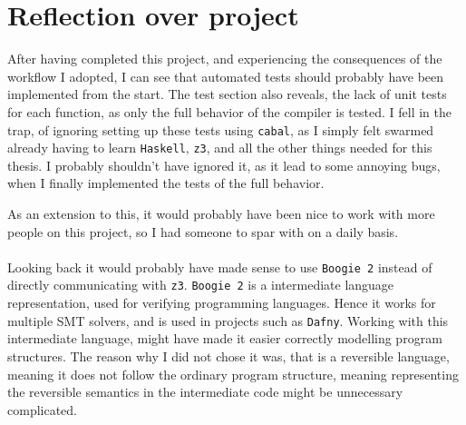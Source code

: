 \section{Reflection over project }
After having completed this project, and experiencing the consequences of the workflow I
adopted, I can see that automated tests should probably have been implemented from the start.
The test section also reveals, the lack of unit tests for each function, as only the full
behavior of the compiler is tested. I fell in the trap, of ignoring setting up these tests
using \texttt{cabal}, as I simply felt swarmed already having to learn \texttt{Haskell}, \texttt{z3},
and all the other things needed for this thesis. I probably shouldn't have ignored it, as it lead
to some annoying bugs, when I finally implemented the tests of the full behavior.

As an extension to this, it would probably have been nice to work with more people on this
project, so I had someone to spar with on a daily basis.
\\
\\
Looking back it would probably have made sense to use \texttt{Boogie 2} instead of directly
communicating with \texttt{z3}. \texttt{Boogie 2} is a intermediate language representation, used
for verifying programming languages. Hence it works for multiple SMT solvers, and is used in
projects such as \texttt{Dafny}. Working with this intermediate language, might have made
it easier correctly modelling program structures. The reason why I did not chose it was, that
\lan is a reversible language, meaning it does not follow the ordinary program structure, meaning
representing the reversible semantics in the intermediate code might be unnecessary complicated.